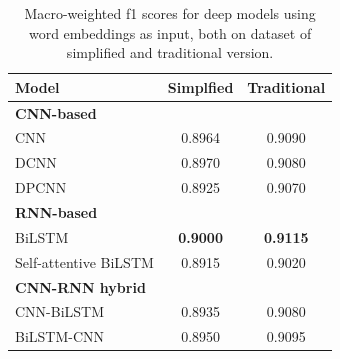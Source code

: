 \documentclass[11pt,a4paper]{article}
\begin{document}
\begin{table}[]
\begin{center}
\begin{tabular}{lcc}
\hline
\textbf{Model}  & \textbf{Simplfied} & \textbf{Traditional} \\ \hline
\multicolumn{3}{l}{\textbf{CNN-based}}          \\
CNN                   & 0.8964    & 0.9090       \\
DCNN                  & 0.8970     & 0.9080       \\
DPCNN                 & 0.8925    & 0.9070       \\ \hline
\multicolumn{3}{l}{\textbf{RNN-based}}          \\
BiLSTM                & \textbf{0.9000}       & \textbf{0.9115}      \\
Self-attentive BiLSTM & 0.8915    & 0.9020       \\ \hline
\multicolumn{3}{l}{\textbf{CNN-RNN hybrid}}     \\
CNN-BiLSTM            & 0.8935    & 0.9080       \\
BiLSTM-CNN            & 0.8950     & 0.9095      \\ \hline
\end{tabular}
\caption{Macro-weighted f1 scores for deep models using word embeddings as input, both on dataset of simplified and traditional version.}
\label{dl_model_p}
\end{center}
\end{table}
\end{document}
